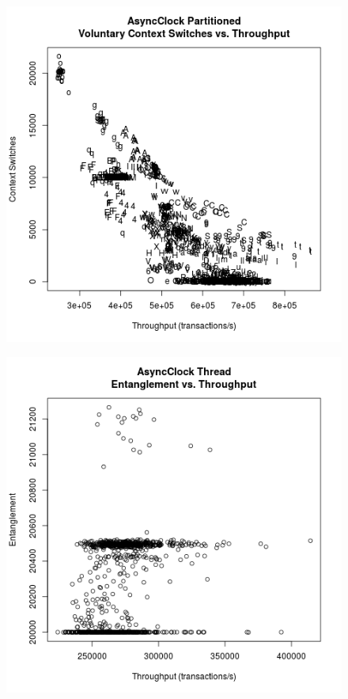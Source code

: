 \begin{figure}
\center
\includegraphics[height=.25\textheight]{async_partitioned_throughput_context.png}
\caption{\label{async_partitioned_throughput_context}}
\end{figure}

\clearpage

\begin{figure}
\center
\includegraphics[height=.25\textheight]{async_thread_throughput_entanglement.png}
\caption{\label{async_thread_throughput_entanglement}}
\end{figure}


